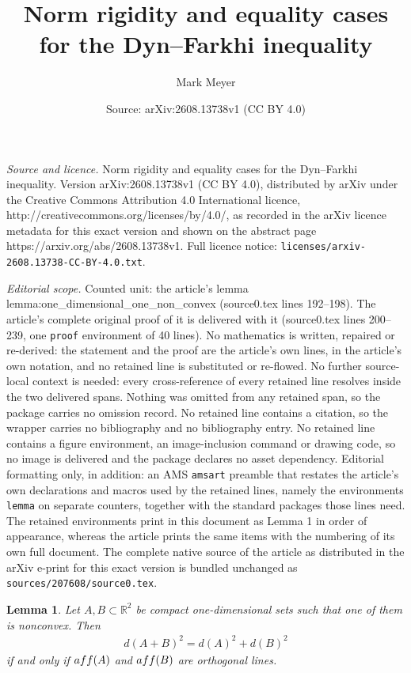 \documentclass[10pt,a4paper]{amsart}
\title{Norm rigidity and equality cases for the Dyn--Farkhi inequality}
\author{Mark Meyer}
\date{Source: arXiv:2608.13738v1 (CC BY 4.0)}
\newtheorem{lemma}{Lemma}
\begin{document}
\maketitle

\noindent\emph{Source and licence.} Norm rigidity and equality cases for the Dyn--Farkhi inequality. Version arXiv:2608.13738v1 (CC BY 4.0), distributed by arXiv under the Creative Commons Attribution 4.0 International licence, http://creativecommons.org/licenses/by/4.0/, as recorded in the arXiv licence metadata for this exact version and shown on the abstract page https://arxiv.org/abs/2608.13738v1. Full licence notice: \texttt{licenses/arxiv-2608.13738-CC-BY-4.0.txt}.\par\smallskip

\noindent\textit{Editorial scope.} Counted unit: the article's lemma lemma:one\_dimensional\_one\_non\_convex (source0.tex lines 192--198). The article's complete original proof of it is delivered with it (source0.tex lines 200--239, one \texttt{proof} environment of 40 lines). No mathematics is written, repaired or re-derived: the statement and the proof are the article's own lines, in the article's own notation, and no retained line is substituted or re-flowed.  No further source-local context is needed: every cross-reference of every retained line resolves inside the two delivered spans.  Nothing was omitted from any retained span, so the package carries no omission record.  No retained line contains a citation, so the wrapper carries no bibliography and no bibliography entry.  No retained line contains a figure environment, an image-inclusion command or drawing code, so no image is delivered and the package declares no asset dependency.  Editorial formatting only, in addition: an AMS \texttt{amsart} preamble that restates the article's own declarations and macros used by the retained lines, namely the environments \texttt{lemma} on separate counters, together with the standard packages those lines need.  The retained environments print in this document as Lemma 1 in order of appearance, whereas the article prints the same items with the numbering of its own full document.  The complete native source of the article as distributed in the arXiv e-print for this exact version is bundled unchanged as \texttt{sources/207608/source0.tex}.
\begin{lemma}\label{lemma:one_dimensional_one_non_convex}
    Let $A,B\subset\mathbb{R}^2$ be compact one-dimensional sets such that one of them is nonconvex. Then
    \begin{align*}
        d(A+B)^2=d(A)^2+d(B)^2
    \end{align*}
    if and only if $\textup{aff}(A)$ and $\textup{aff}(B)$ are orthogonal lines. 
\end{lemma}
\end{document}
